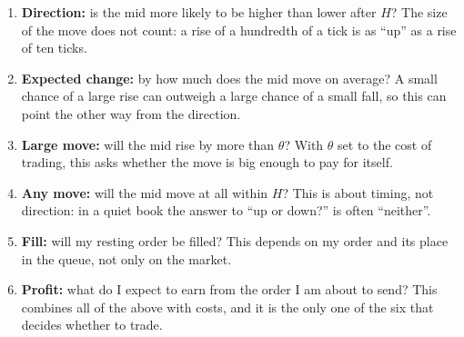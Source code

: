 \begin{enumerate}[leftmargin=1.8em,itemsep=2pt]
\item \textbf{Direction:} is the mid more likely to be higher than lower after $H$? The size of the move does not
  count: a rise of a hundredth of a tick is as ``up'' as a rise of ten ticks.
\item \textbf{Expected change:} by how much does the mid move on average? A small chance of a large rise can
  outweigh a large chance of a small fall, so this can point the other way from the direction.
\item \textbf{Large move:} will the mid rise by more than $\theta$? With $\theta$ set to the cost of trading, this
  asks whether the move is big enough to pay for itself.
\item \textbf{Any move:} will the mid move at all within $H$? This is about timing, not direction: in a quiet book
  the answer to ``up or down?'' is often ``neither''.
\item \textbf{Fill:} will my resting order be filled? This depends on my order and its place in the queue, not
  only on the market.
\item \textbf{Profit:} what do I expect to earn from the order I am about to send? This combines all of the above
  with costs, and it is the only one of the six that decides whether to trade.
\end{enumerate}

